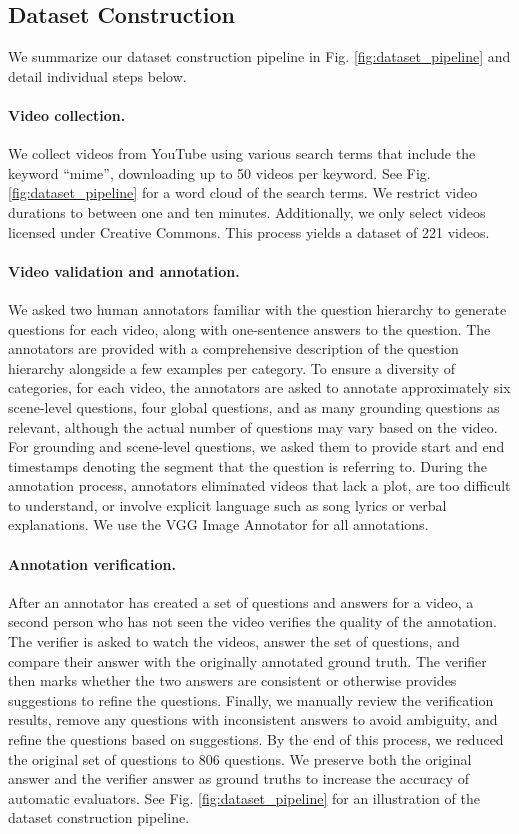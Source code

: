 \subsection{Dataset Construction}
We summarize our dataset construction pipeline in Fig. \ref{fig:dataset_pipeline} and detail individual steps below.

\paragraph{Video collection.} We collect videos from YouTube using various search terms that include the keyword ``mime'', downloading up to 50 videos per keyword. See Fig. \ref{fig:dataset_pipeline} for a word cloud of the search terms. We restrict video durations to between one and ten minutes. Additionally, we only select videos licensed under Creative Commons. This process yields a dataset of 221 videos.

\paragraph{Video validation and annotation.} We asked two human annotators familiar with the question hierarchy to generate questions for each video, along with one-sentence answers to the question. The annotators are provided with a comprehensive description of the question hierarchy alongside a few examples per category. To ensure a diversity of categories, for each video, the annotators are asked to annotate approximately six scene-level questions, four global questions, and as many grounding questions as relevant, although the actual number of questions may vary based on the video. For grounding and scene-level questions, we asked them to provide start and end timestamps denoting the segment that the question is referring to. During the annotation process, annotators eliminated videos that lack a plot, are too difficult to understand, or involve explicit language such as song lyrics or verbal explanations. We use the VGG Image Annotator \cite{dutta2019vgg} for all annotations.

\paragraph{Annotation verification.} After an annotator has created a set of questions and answers for a video, a second person who has not seen the video verifies the quality of the annotation. The verifier is asked to watch the videos, answer the set of questions, and compare their answer with the originally annotated ground truth. The verifier then marks whether the two answers are consistent or otherwise provides suggestions to refine the questions. Finally, we manually review the verification results, remove any questions with inconsistent answers to avoid ambiguity, and refine the questions based on suggestions. By the end of this process, we reduced the original set of questions to 806 questions. We preserve both the original answer and the verifier answer as ground truths to increase the accuracy of automatic evaluators. See Fig. \ref{fig:dataset_pipeline} for an illustration of the dataset construction pipeline.

